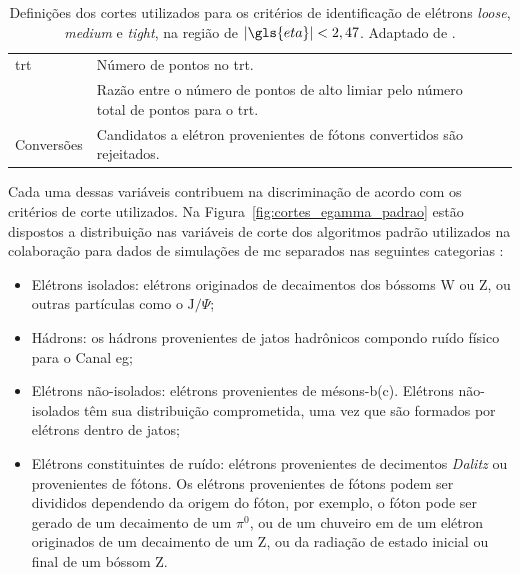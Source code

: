 \begin{table}
{\begin{tabular}{p{4cm}p{9cm}c}
\hline
\gls{trt} & Número de pontos no \gls{trt}. & \\
 & Razão entre o número de pontos de alto limiar pelo número total de pontos para o
\gls{trt}. & \\
\hline
Conversões & Candidatos a elétron provenientes de fótons convertidos são
rejeitados. & \\
\hline
\hline
\end{tabular}
}
\caption[Definições dos cortes utilizados para os critérios de identificação de elétrons \emph{loose}, \emph{medium}
e \emph{tight}, na região de $|\eta|<2,47$]
{Definições dos cortes utilizados para os critérios de identificação de elétrons \emph{loose}, \emph{medium}
e \emph{tight}, na região de $|\gls{eta}|<2,47$. Adaptado de \cite{expected_perf_2011}.}
\label{tab:cortes_em}
\end{table}

Cada uma dessas variáveis contribuem na discriminação de acordo com os critérios
de corte utilizados. Na Figura~\ref{fig:cortes_egamma_padrao} estão dispostos a
distribuição nas variáveis de corte dos algoritmos padrão utilizados na
colaboração para dados de simulações de \gls{mc} separados nas seguintes 
categorias \cite{expected_perf_2011}:

\begin{itemize}
\item Elétrons isolados: elétrons originados de decaimentos dos
bóssoms W ou Z, ou outras partículas como o $\text{J}/\Psi$;
\item Hádrons: os hádrons provenientes de
jatos hadrônicos compondo ruído físico para o Canal \gls{eg};
\item Elétrons não-isolados: elétrons
provenientes de mésons-b(c). Elétrons não-isolados têm sua distribuição
comprometida, uma vez que são formados por elétrons dentro de jatos;
\item Elétrons constituintes de ruído: elétrons
provenientes de decimentos \emph{Dalitz} ou provenientes de fótons. Os elétrons
provenientes de fótons podem ser divididos dependendo da origem do fóton, por
exemplo, o fóton pode ser gerado de um decaimento de um $\pi^0$, ou de um
chuveiro \gls{em} de um elétron originados de um decaimento de um Z, ou da
radiação de estado inicial ou final de um bóssom Z.
\end{itemize}

